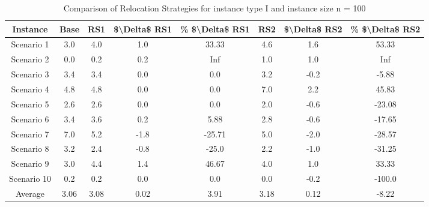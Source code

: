 \begin{table}[H]
\centering
\begin{tabular}{cccccccc}
  \hline
  \textbf{Instance} & \textbf{Base} & \textbf{RS1} & \textbf{\$\textbackslash{}Delta\$  RS1} & \textbf{\% \$\textbackslash{}Delta\$  RS1} & \textbf{RS2} & \textbf{\$\textbackslash{}Delta\$  RS2} & \textbf{\% \$\textbackslash{}Delta\$  RS2} \\\hline
  Scenario 1 & 3.0 & 4.0 & 1.0 & 33.33 & 4.6 & 1.6 & 53.33 \\
  Scenario 2 & 0.0 & 0.2 & 0.2 & Inf & 1.0 & 1.0 & Inf \\
  Scenario 3 & 3.4 & 3.4 & 0.0 & 0.0 & 3.2 & -0.2 & -5.88 \\
  Scenario 4 & 4.8 & 4.8 & 0.0 & 0.0 & 7.0 & 2.2 & 45.83 \\
  Scenario 5 & 2.6 & 2.6 & 0.0 & 0.0 & 2.0 & -0.6 & -23.08 \\
  Scenario 6 & 3.4 & 3.6 & 0.2 & 5.88 & 2.8 & -0.6 & -17.65 \\
  Scenario 7 & 7.0 & 5.2 & -1.8 & -25.71 & 5.0 & -2.0 & -28.57 \\
  Scenario 8 & 3.2 & 2.4 & -0.8 & -25.0 & 2.2 & -1.0 & -31.25 \\
  Scenario 9 & 3.0 & 4.4 & 1.4 & 46.67 & 4.0 & 1.0 & 33.33 \\
  Scenario 10 & 0.2 & 0.2 & 0.0 & 0.0 & 0.0 & -0.2 & -100.0 \\
  Average & 3.06 & 3.08 & 0.02 & 3.91 & 3.18 & 0.12 & -8.22 \\\hline
\end{tabular}
\caption{Comparison of Relocation Strategies for instance type I and instance size n = 100}
\label{tab:wait:resrelocation-comparison_I_100}
\end{table}
